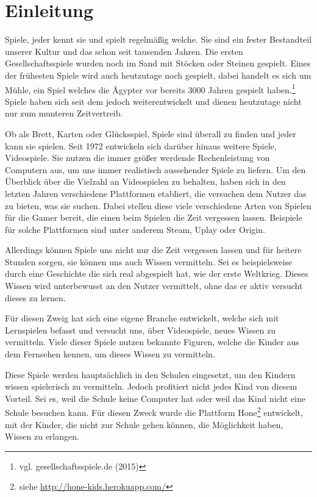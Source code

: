 \chapter{Einleitung}

Spiele, jeder kennt sie und spielt regelmäßig welche. Sie sind ein fester Bestandteil unserer Kultur und das schon seit tausenden Jahren. Die ersten Gesellschaftsspiele wurden noch im Sand mit Stöcken oder Steinen gespielt. Eines der frühesten Spiele wird auch heutzutage noch gespielt, dabei handelt es sich um Mühle, ein Spiel welches die Ägypter vor bereits 3000 Jahren gespielt haben.\footnote{vgl. gesellschaftsspiele.de \cite{spiele} (2015)} Spiele haben sich seit dem jedoch weiterentwickelt und dienen heutzutage nicht nur zum munteren Zeitvertreib. 

Ob als Brett, Karten oder Glücksspiel, Spiele sind überall zu finden und jeder kann sie spielen. Seit 1972 entwickeln sich darüber hinaus weitere Spiele, Videospiele. Sie nutzen die immer größer werdende Rechenleistung von Computern aus, um uns immer realistisch aussehender Spiele zu liefern. 
Um den Überblick über die Vielzahl an Videospielen zu behalten, haben sich in den letzten Jahren verschiedene Plattformen etabliert, die versuchen dem Nutzer das zu bieten, was sie suchen. Dabei stellen diese viele verschiedene Arten von Spielen für die Gamer bereit, die einen beim Spielen die Zeit vergessen lassen. Beispiele für solche Plattformen sind unter anderem Steam, Uplay oder Origin.

Allerdings können Spiele uns nicht nur die Zeit vergessen lassen und für heitere Stunden sorgen, sie können uns auch Wissen vermitteln. Sei es beispielsweise durch eine Geschichte die sich real abgespielt hat, wie der erste Weltkrieg. Dieses Wissen wird unterbewusst an den Nutzer vermittelt, ohne das er aktiv versucht dieses zu lernen.

Für diesen Zweig hat sich eine eigene Branche entwickelt, welche sich mit Lernspielen befasst und versucht uns, über Videospiele, neues Wissen zu vermitteln. Viele dieser Spiele nutzen bekannte Figuren, welche die Kinder aus dem Fernsehen kennen, um dieses Wissen zu vermitteln.

Diese Spiele werden hauptsächlich in den Schulen eingesetzt, um den Kindern wissen spielerisch zu vermitteln. Jedoch profitiert nicht jedes Kind von diesem Vorteil. Sei es, weil die Schule keine Computer hat oder weil das Kind nicht eine Schule besuchen kann. Für diesen Zweck wurde die Plattform Hone\footnote{siehe \url{http://hone-kids.herokuapp.com/}} entwickelt, mit der Kinder, die nicht zur Schule gehen können, die Möglichkeit haben, Wissen zu erlangen. 

